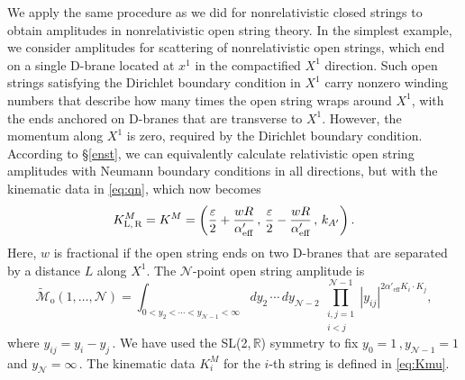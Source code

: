 \documentclass[11pt]{article}
\newcommand{\be}{\begin{equation}}
\newcommand{\ee}{\end{equation}}
\newcommand{\CN}{\mathcal{N}}
\newcommand{\CM}{\mathcal{M}}
\newcommand{\lr}{\left (}
\newcommand{\rr}{\right )}
\renewcommand{\tilde}[1]{\widetilde{#1}}
\begin{document}
We apply the same procedure as we did for nonrelativistic closed strings to obtain amplitudes in nonrelativistic open string theory.  In the simplest example, we consider amplitudes for scattering of nonrelativistic open strings, which end on a single D-brane located at $x^1$ in the compactified $X^1$ direction. Such open strings satisfying the Dirichlet boundary condition in $X^1$ carry nonzero winding numbers that describe how many times the open string wraps around $X^1$, with the ends anchored on D-branes that are transverse to $X^1$. However, the momentum along $X^1$ is zero, required by the Dirichlet boundary condition.
According to \S\ref{enst}, we can equivalently calculate relativistic open string amplitudes with Neumann boundary conditions in all directions, but with the kinematic data in \eqref{eq:qn}, which now becomes
%
\be \label{eq:Kmu}
    K_\text{L,\,R}^M = K^M = \lr \frac{\varepsilon}{2} + \frac{w R}{\alpha'_\text{eff}}\,, \, \frac{\varepsilon}{2} - \frac{w R}{\alpha'_\text{eff}}\,, \, k_{A'} \rr.
\ee
%
Here, $w$ is fractional if the open string ends on two D-branes that are separated by a distance $L$ along $X^1$. The $\CN$-point open string amplitude is 
%
\be \label{eq:mon}
    \tilde{\CM}_\text{o} (1, \dots, \CN) = \int_{0 < y_2 < \cdots < y_{\CN-1} < \infty} dy_2 \, \cdots \, dy_{\CN-2}  \, \prod_{\substack{i,j = 1\\i<j}}^{\CN-1} |y_{ij}|^{2 \alpha'_\text{eff} K_{i} \cdot K_j},
\ee
%
where $y_{ij} = y_i - y_j$\,. 
We have used the SL(2,\,$\mathbb{R}$) symmetry to fix $y_0 = 1\,, y_{\CN-1} = 1$ and $y_\CN = \infty$\,.  The kinematic data $K^M_i$ for the $i$-th string is defined in \eqref{eq:Kmu}. 
\end{document}
